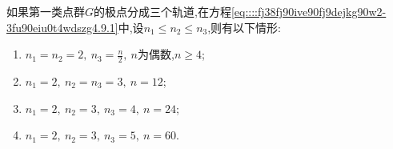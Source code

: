 \documentclass[../../main.tex]{subfiles}%
\begin{document}
\begin{theorem}\label{theorem:抽象代数--定理4.9.4}
如果第一类点群$G$的极点分成三个轨道,在方程\eqref{eq::::fj38fj90ive90fj9dejkg90w2-3fu90eiu0t4wdszg4.9.1}中,设$n_1\leqslant n_2\leqslant n_3$,则有以下情形:
\begin{enumerate}[(1)]
\item $n_1=n_2=2,\ n_3=\frac{n}{2},\ n$为偶数,$n\geqslant 4$;

\item $n_1=2,\ n_2=n_3=3,\ n=12$;

\item $n_1=2,\ n_2=3,\ n_3=4,\ n=24$;

\item $n_1=2,\ n_2=3,\ n_3=5,\ n=60$.
\end{enumerate}
\end{theorem}
\end{document}

